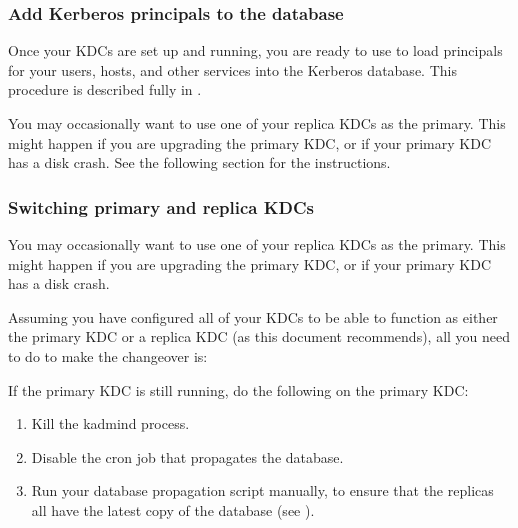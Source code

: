 \documentclass[letterpaper,10pt,english]{sphinxmanual}
\begin{document}
\subsubsection{Add Kerberos principals to the database}
\label{\detokenize{admin/install_kdc:add-kerberos-principals-to-the-database}}
Once your KDCs are set up and running, you are ready to use
{\hyperref[\detokenize{admin/admin_commands/kadmin_local:kadmin-1}]{}} to load principals for your users, hosts, and other
services into the Kerberos database.  This procedure is described
fully in {\hyperref[\detokenize{admin/database:principals}]{}}.

You may occasionally want to use one of your replica KDCs as the
primary.  This might happen if you are upgrading the primary KDC, or
if your primary KDC has a disk crash.  See the following section for
the instructions.


\subsubsection{Switching primary and replica KDCs}
\label{\detokenize{admin/install_kdc:switch-primary-replica}}\label{\detokenize{admin/install_kdc:switching-primary-and-replica-kdcs}}
You may occasionally want to use one of your replica KDCs as the
primary.  This might happen if you are upgrading the primary KDC, or
if your primary KDC has a disk crash.

Assuming you have configured all of your KDCs to be able to function
as either the primary KDC or a replica KDC (as this document
recommends), all you need to do to make the changeover is:

If the primary KDC is still running, do the following on the 
primary KDC:
\begin{enumerate}
\item {} 
Kill the kadmind process.

\item {} 
Disable the cron job that propagates the database.

\item {} 
Run your database propagation script manually, to ensure that the
replicas all have the latest copy of the database (see
{\hyperref[\detokenize{admin/install_kdc:kprop-to-replicas}]{}}).

\end{enumerate}
\end{document}
